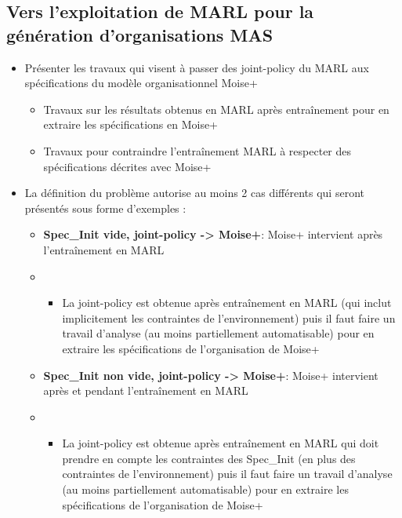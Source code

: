 \subsection{Vers l'exploitation de MARL pour la génération d'organisations MAS}

\begin{itemize}

    \item Présenter les travaux qui visent à passer des joint-policy du MARL aux spécifications du modèle organisationnel Moise+
          \begin{itemize}

              \item Travaux sur les résultats obtenus en MARL après entraînement pour en extraire les spécifications en Moise+
              \item Travaux pour contraindre l'entraînement MARL à respecter des spécifications décrites avec Moise+
          \end{itemize}
    \item La définition du problème autorise au moins 2 cas différents qui seront présentés sous forme d'exemples :
          \begin{itemize}
              \item \textbf{Spec\_Init vide, joint-policy -> Moise+}: Moise+ intervient après l'entraînement en MARL
              \item \begin{itemize}
                        \item La joint-policy est obtenue après entraînement en MARL (qui inclut implicitement les contraintes de l'environnement) puis il faut faire un travail d'analyse (au moins partiellement automatisable) pour en extraire les spécifications de l'organisation de Moise+
                    \end{itemize}
              \item \textbf{Spec\_Init non vide, joint-policy -> Moise+}: Moise+ intervient après et pendant l'entraînement en MARL
              \item \begin{itemize}
                        \item La joint-policy est obtenue après entraînement en MARL qui doit prendre en compte les contraintes des Spec\_Init (en plus des contraintes de l'environnement) puis il faut faire un travail d'analyse (au moins partiellement automatisable) pour en extraire les spécifications de l'organisation de Moise+

\end{itemize}
\end{itemize}
\end{itemize}
